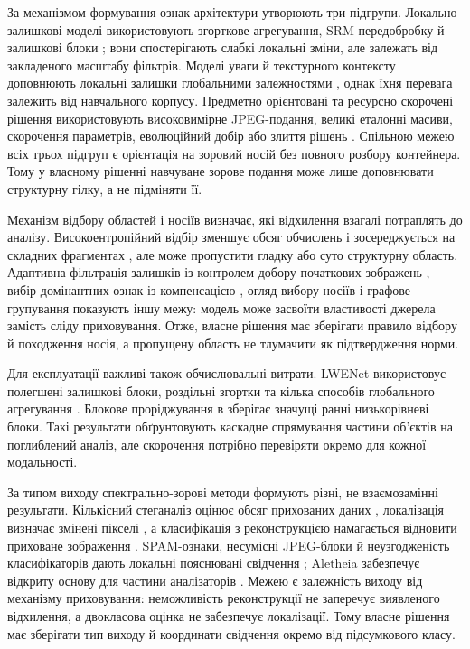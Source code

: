 За механізмом формування ознак архітектури утворюють три підгрупи. Локально-залишкові моделі використовують згорткове агрегування, SRM-передобробку й залишкові блоки \cite{fu2022ccnet,bravoortiz2024cvtstegonet,ntivuguruzwa2023cnn}; вони спостерігають слабкі локальні зміни, але залежать від закладеного масштабу фільтрів. Моделі уваги й текстурного контексту доповнюють локальні залишки глобальними залежностями \cite{xie2023selfattention,zhou2024texturetransformer}, однак їхня перевага залежить від навчального корпусу. Предметно орієнтовані та ресурсно скорочені рішення використовують високовимірне JPEG-подання, великі еталонні масиви, скорочення параметрів, еволюційний добір або злиття рішень \cite{xu2025jpegmap,gao2025recognition,huang2024sasrnet,ma2025evolutionary,swarnkar2024fusion}. Спільною межею всіх трьох підгруп є орієнтація на зоровий носій без повного розбору контейнера. Тому у власному рішенні навчуване зорове подання може лише доповнювати структурну гілку, а не підміняти її.

Механізм відбору областей і носіїв визначає, які відхилення взагалі потраплять до аналізу. Високоентропійний відбір зменшує обсяг обчислень і зосереджується на складних фрагментах \cite{agarwal2024entropy}, але може пропустити гладку або суто структурну область. Адаптивна фільтрація залишків із контролем добору початкових зображень \cite{ma2023coverselection}, вибір домінантних ознак із компенсацією \cite{yu2024dominantfeatures}, огляд вибору носіїв і графове групування \cite{azame2025coverselection,dehdar2023graph} показують іншу межу: модель може засвоїти властивості джерела замість сліду приховування. Отже, власне рішення має зберігати правило відбору й походження носія, а пропущену область не тлумачити як підтвердження норми.

Для експлуатації важливі також обчислювальні витрати. LWENet використовує полегшені залишкові блоки, роздільні згортки та кілька способів глобального агрегування \cite{weng2022lwenet}. Блокове проріджування в \cite{hong2023blockpruning} зберігає значущі ранні низькорівневі блоки. Такі результати обґрунтовують каскадне спрямування частини об’єктів на поглиблений аналіз, але скорочення потрібно перевіряти окремо для кожної модальності.

За типом виходу спектрально-зорові методи формують різні, не взаємозамінні результати. Кількісний стеганаліз оцінює обсяг прихованих даних \cite{singhal2024ustegdse}, локалізація визначає змінені пікселі \cite{ntivuguruzwa2023localization}, а класифікація з реконструкцією намагається відновити приховане зображення \cite{lai2022ffrnet}. SPAM-ознаки, несумісні JPEG-блоки й неузгодженість класифікаторів дають локальні пояснювані свідчення \cite{hemalatha2023spam,levecque2024jpeg,lerch2023actor}; Aletheia забезпечує відкриту основу для частини аналізаторів \cite{lerch2024aletheia}. Межею є залежність виходу від механізму приховування: неможливість реконструкції не заперечує виявленого відхилення, а двокласова оцінка не забезпечує локалізації. Тому власне рішення має зберігати тип виходу й координати свідчення окремо від підсумкового класу.

